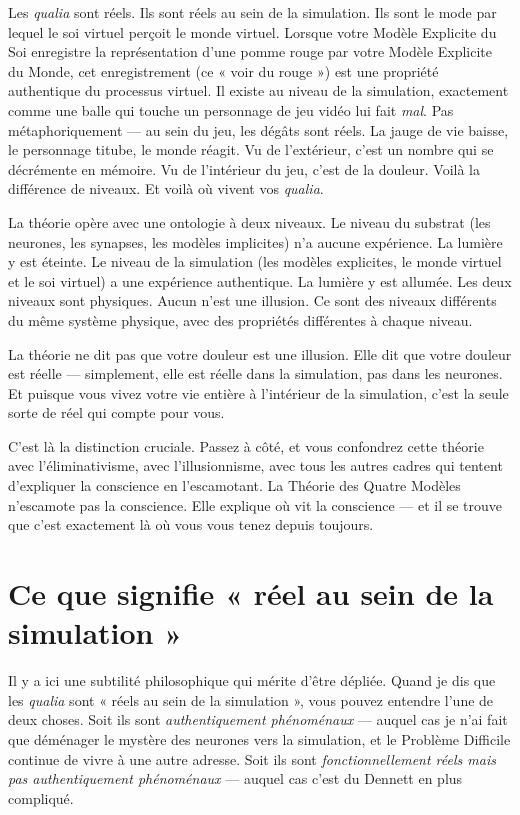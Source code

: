 \documentclass[11pt, twoside, openright]{book}
\begin{document}
Les \textit{qualia} sont réels. Ils sont réels au sein de la simulation. Ils sont le mode par lequel le soi virtuel perçoit le monde virtuel. Lorsque votre Modèle Explicite du Soi enregistre la représentation d'une pomme rouge par votre Modèle Explicite du Monde, cet enregistrement (ce « voir du rouge ») est une propriété authentique du processus virtuel. Il existe au niveau de la simulation, exactement comme une balle qui touche un personnage de jeu vidéo lui fait \textit{mal}. Pas métaphoriquement --- au sein du jeu, les dégâts sont réels. La jauge de vie baisse, le personnage titube, le monde réagit. Vu de l'extérieur, c'est un nombre qui se décrémente en mémoire. Vu de l'intérieur du jeu, c'est de la douleur. Voilà la différence de niveaux. Et voilà où vivent vos \textit{qualia}.

La théorie opère avec une ontologie à deux niveaux. Le niveau du substrat (les neurones, les synapses, les modèles implicites) n'a aucune expérience. La lumière y est éteinte. Le niveau de la simulation (les modèles explicites, le monde virtuel et le soi virtuel) a une expérience authentique. La lumière y est allumée. Les deux niveaux sont physiques. Aucun n'est une illusion. Ce sont des niveaux différents du même système physique, avec des propriétés différentes à chaque niveau.

La théorie ne dit pas que votre douleur est une illusion. Elle dit que votre douleur est réelle --- simplement, elle est réelle dans la simulation, pas dans les neurones. Et puisque vous vivez votre vie entière à l'intérieur de la simulation, c'est la seule sorte de réel qui compte pour vous.

C'est là la distinction cruciale. Passez à côté, et vous confondrez cette théorie avec l'éliminativisme, avec l'illusionnisme, avec tous les autres cadres qui tentent d'expliquer la conscience en l'escamotant. La Théorie des Quatre Modèles n'escamote pas la conscience. Elle explique où vit la conscience --- et il se trouve que c'est exactement là où vous vous tenez depuis toujours.

\section*{Ce que signifie « réel au sein de la simulation »}

Il y a ici une subtilité philosophique qui mérite d'être dépliée. Quand je dis que les \textit{qualia} sont « réels au sein de la simulation », vous pouvez entendre l'une de deux choses. Soit ils sont \textit{authentiquement phénoménaux} --- auquel cas je n'ai fait que déménager le mystère des neurones vers la simulation, et le Problème Difficile continue de vivre à une autre adresse. Soit ils sont \textit{fonctionnellement réels mais pas authentiquement phénoménaux} --- auquel cas c'est du Dennett en plus compliqué.
\end{document}
